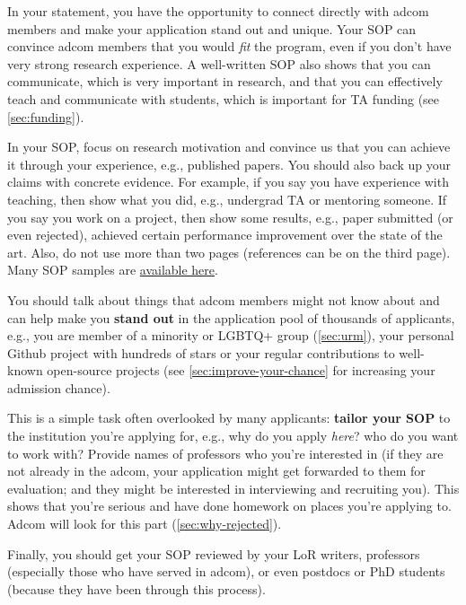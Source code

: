 \documentclass[oneside,11pt,dvipsnames]{book}
\begin{document}
In your statement, you have the opportunity to connect directly with adcom members and make your application stand out and unique. Your SOP can convince adcom members that you would \emph{fit} the program, even if you don't have very strong research experience.
A well-written SOP also shows that you can communicate, which is very important in research, and that you can effectively teach and communicate with students, which is important for TA funding (see \autoref{sec:funding}).

In your SOP, focus on research motivation and convince us that you can achieve it through your experience, e.g., published papers. You should also back up your claims with concrete evidence. For example, if you say you have experience with teaching, then show what you did, e.g., undergrad TA or mentoring someone.  If you say you work on a project, then show some results, e.g., paper submitted (or even rejected), achieved certain performance improvement over the state of the art. Also, do not use more than two pages (references can be on the third page). Many SOP samples are \href{https://cs-sop.org/}{available here}.

You should talk about things that adcom members might not know about and can help make you \textbf{stand out} in the application pool of thousands of applicants, e.g., you are member of a minority or LGBTQ+ group (\autoref{sec:urm}), your personal Github project with hundreds of stars or your regular contributions to well-known open-source projects (see \autoref{sec:improve-your-chance} for increasing your admission chance).


This is a simple task often overlooked by many applicants: \textbf{tailor your SOP} to the institution you're applying for,
e.g., why do you apply \emph{here}? who do you want to work with?
Provide names of professors who you're interested in (if they are not already in the adcom, your application might get forwarded to them for evaluation; and they might be interested in interviewing and recruiting you).
This shows that you're serious and have done homework on places you're applying to.
Adcom will look for this part (\autoref{sec:why-rejected}).

Finally, you should get your SOP reviewed by your LoR writers, professors (especially those who have served in adcom), or even postdocs or PhD students (because they have been through this process).
\end{document}
